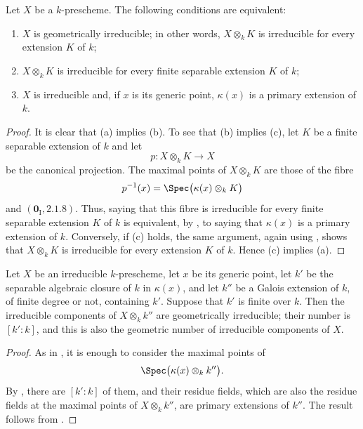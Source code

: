 \begin{proposition}[4.5.9]
\label{IV.4.5.9}
Let $X$ be a $k$-prescheme.  The following conditions are equivalent:
\begin{enumerate}
\item[\rm(a)]
\label{IV.4.5.9.a}
$X$ is geometrically irreducible; in other words,
$X\otimes_k K$ is irreducible for every extension $K$ of $k$;

\item[\rm(b)]
\label{IV.4.5.9.b}
$X\otimes_k K$ is irreducible for every finite separable extension
$K$ of $k$;

\item[\rm(c)]
\label{IV.4.5.9.c}
$X$ is irreducible and, if $x$ is its generic point,
$\kappa(x)$ is a primary extension of $k$.
\end{enumerate}
\end{proposition}

\begin{proof}
It is clear that (a) implies (b).
To see that (b) implies (c), let $K$ be a finite separable extension
of $k$ and let
\[
p:X\otimes_k K\longrightarrow X
\]
be the canonical projection.
The maximal points of $X\otimes_k K$ are those of the fibre
\[
p^{-1}(x)=\Spec\bigl(\kappa(x)\otimes_k K\bigr)
\]
 and $(\mathbf{0}_{\mathrm I},2.1.8)$.
Thus, saying that this fibre is irreducible for every finite separable
extension $K$ of $k$ is equivalent, by , to saying that
$\kappa(x)$ is a primary extension of $k$.
Conversely, if (c) holds, the same argument, again using
, shows that $X\otimes_k K$ is irreducible for every
extension $K$ of $k$.
Hence (c) implies (a).
\end{proof}


\begin{corollary}[4.5.10]
\label{IV.4.5.10}
Let $X$ be an irreducible $k$-prescheme, let $x$ be its generic point,
let $k'$ be the separable algebraic closure of $k$ in $\kappa(x)$,
and let $k''$ be a Galois extension of $k$, of finite degree or not,
containing $k'$.
Suppose that $k'$ is finite over $k$.
Then the irreducible components of $X\otimes_k k''$ are geometrically
irreducible; their number is $[k':k]$, and this is also the geometric
number of irreducible components of $X$.
\end{corollary}

\begin{proof}
As in , it is enough to consider the maximal points of
\[
\Spec\bigl(\kappa(x)\otimes_k k''\bigr).
\]
By , there are $[k':k]$ of them, and their residue
fields, which are also the residue fields at the maximal points of
$X\otimes_k k''$, are primary extensions of $k''$.
The result follows from .
\end{proof}

